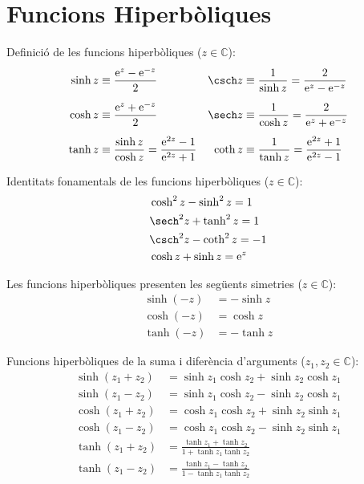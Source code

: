 \section{Funcions Hiperbòliques}

Definició de les funcions hiperbòliques ($z\in\mathbb{C}$):
\begin{subequations}
\begin{align}
    \sinh z&\equiv \frac{\eu^z - \eu^{-z}}{2} & \csch z &\equiv\frac{1}{\sinh z} =
    \frac{2}{\eu^z - \eu^{-z}}\\[1ex]
    \cosh z&\equiv \frac{\eu^z + \eu^{-z}}{2} & \sech z &\equiv\frac{1}{\cosh z} =
    \frac{2}{\eu^z + \eu^{-z}}\\[1ex]
    \tanh z&\equiv \frac{\sinh z}{\cosh z} = \frac{\eu^{2z}-1}{\eu^{2z}+1} &
    \coth z &\equiv\frac{1}{\tanh z} = \frac{\eu^{2z}+1}{\eu^{2z}-1}
\end{align}
\end{subequations}

Identitats fonamentals de les funcions hiperbòliques
($z\in\mathbb{C}$):
\begin{align}
    &\cosh^2 z - \sinh^2 z = 1 \\
    &\sech^2 z + \tanh^2 z = 1 \\
    &\csch^2 z - \coth^2 z = -1 \\
    &\cosh z + \sinh z = \eu^z
\end{align}

Les funcions hiperbòliques presenten les següents simetries
($z\in\mathbb{C}$):
\begin{subequations}
\begin{align}
    \sinh (-z) &= -\sinh z \\
    \cosh (-z) &= \cosh z\\
    \tanh (-z) &= -\tanh z
\end{align}
\end{subequations}

Funcions hiperbòliques de la suma i diferència d'arguments ($z_1,
z_2\in\mathbb{C}$):
\begin{subequations}
\begin{align}
    \sinh(z_1+z_2) &= \sinh z_1 \cosh z_2 + \sinh z_2\cosh z_1\\[1ex]
    \sinh(z_1-z_2) &= \sinh z_1 \cosh z_2 - \sinh z_2\cosh z_1\\[1ex]
    \cosh(z_1+z_2) &= \cosh z_1 \cosh z_2 + \sinh z_2\sinh z_1\\[1ex]
    \cosh(z_1-z_2) &= \cosh z_1 \cosh z_2 - \sinh z_2\sinh z_1\\[1ex]
    \tanh(z_1+z_2) &=\frac{\tanh z_1+\tanh z_2}{1+\tanh z_1\tanh z_2}\\[1ex]
    \tanh(z_1-z_2) &=\frac{\tanh z_1-\tanh z_2}{1-\tanh z_1\tanh z_2}
\end{align}
\end{subequations}

